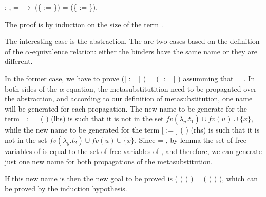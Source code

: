 \begin{coqdoccode}
\coqdocemptyline
\coqdocnoindent
{} : \coqdockw{\ensuremath{\forall}}    ,  =  \ensuremath{\rightarrow} (\{ := \}) = (\{ := \}).\coqdoceol
\end{coqdoccode}
 The proof is by induction on the size of the term . 
\begin{coqdoccode}
\end{coqdoccode}
The interesting case is the abstraction. The are two cases based on the definition of the $\alpha$-equivalence relation: either the binders have the same name or they are different. 
\begin{coqdoccode}
\end{coqdoccode}
In the former case, we have to prove  ([ := ]   ) = ([ := ]   ) assumming that  = . In both sides of the $\alpha$-equation, the metasubstitutition need to be propagated over the abstraction, and according to our definition of metasubstitution, one name will be generated for each propagation. The new name to be generate for the term [ := ] (  ) (lhs) is such that it is not in the set $fv(\lambda_y.t_1)\cup fv(u) \cup \{x\}$, while the new name to be generated for the term [ := ] (  ) (rhs) is such that it is not in the set $fv(\lambda_y.t_2)\cup fv(u) \cup \{x\}$. Since  = , by lemma  the set of free variables of  is equal to the set of free variables of , and therefore, we can generate just one new name for both propagations of the metasubstitution. 
\begin{coqdoccode}
\end{coqdoccode}
If this new name is  then the new goal to be proved is   ( (   )  ) =   ( (   )  ), which can be proved by the induction hypothesis. 
